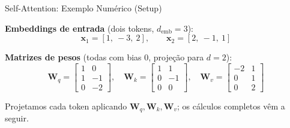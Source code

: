 \documentclass[aspectratio=169,xcolor=dvipsnames]{beamer}
\begin{document}
\begin{frame}[shrink=10]{Self-Attention: Exemplo Numérico (Setup)}

\textbf{Embeddings de entrada} (dois tokens, $d_{\text{emb}}=3$):
\[
\mathbf{x}_1 = [1,\ -3,\ 2], \qquad \mathbf{x}_2 = [2,\ -1,\ 1]
\]

\textbf{Matrizes de pesos} (todas com bias $0$, projeção para $d=2$):
\[
\mathbf{W}_q = \begin{bmatrix} 1 & 0 \\ 1 & -1 \\ 0 & -2 \end{bmatrix}, \quad
\mathbf{W}_k = \begin{bmatrix} 1 & 1 \\ 0 & -1 \\ 0 & 0 \end{bmatrix}, \quad
\mathbf{W}_v = \begin{bmatrix} -2 & 1 \\ 0 & 1 \\ 0 & 2 \end{bmatrix}
\]

\vspace{4pt}
\centering
Projetamos cada token aplicando $\mathbf{W}_q, \mathbf{W}_k, \mathbf{W}_v$; os cálculos completos vêm a seguir.

\end{frame}

\end{document}
